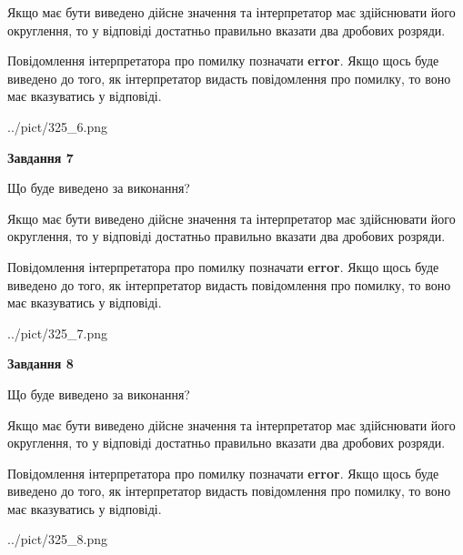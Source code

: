 \documentclass[12pt, ukrainian]{article}
\begin{document}
{\begin {Large}
Якщо має бути виведено дійсне значення та інтерпретатор має здійснювати його округлення, 
то у відповіді достатньо правильно вказати два дробових розряди.

Повідомлення інтерпретатора про помилку позначати \textbf{error}.
Якщо щось буде виведено до того, як інтерпретатор видасть повідомлення про помилку, 
то воно має вказуватись у відповіді. \par

\begin{center}
	{../pict/325_6.png}
\end{center}
\newpage

{\begin {center}\textbf{Завдання 7}\end {center}}\par
Що буде виведено за виконання? \par

Якщо має бути виведено дійсне значення та інтерпретатор має здійснювати його округлення, 
то у відповіді достатньо правильно вказати два дробових розряди.

Повідомлення інтерпретатора про помилку позначати \textbf{error}.
Якщо щось буде виведено до того, як інтерпретатор видасть повідомлення про помилку, 
то воно має вказуватись у відповіді. \par

\begin{center}
	{../pict/325_7.png}
\end{center}
\newpage

{\begin {center}\textbf{Завдання 8}\end {center}}\par
Що буде виведено за виконання? \par

Якщо має бути виведено дійсне значення та інтерпретатор має здійснювати його округлення, 
то у відповіді достатньо правильно вказати два дробових розряди.

Повідомлення інтерпретатора про помилку позначати \textbf{error}.
Якщо щось буде виведено до того, як інтерпретатор видасть повідомлення про помилку, 
то воно має вказуватись у відповіді. \par

\begin{center}
	{../pict/325_8.png}
\end{center}
\newpage


\end{Large}}
\end{document}
